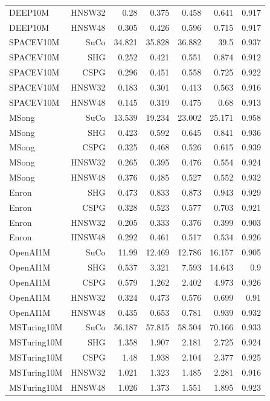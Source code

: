 \begin{table}[t]
\begin{tabular}{lrrrrrr}
DEEP10M & HNSW32 & 0.28 & 0.375 & 0.458 & 0.641 & 0.917 \\
DEEP10M & HNSW48 & 0.305 & 0.426 & 0.596 & 0.715 & 0.917 \\
SPACEV10M & SuCo & 34.821 & 35.828 & 36.882 & 39.5 & 0.937 \\
SPACEV10M & SHG & 0.252 & 0.421 & 0.551 & 0.874 & 0.912 \\
SPACEV10M & CSPG & 0.296 & 0.451 & 0.558 & 0.725 & 0.922 \\
SPACEV10M & HNSW32 & 0.183 & 0.301 & 0.413 & 0.563 & 0.916 \\
SPACEV10M & HNSW48 & 0.145 & 0.319 & 0.475 & 0.68 & 0.913 \\
MSong & SuCo & 13.539 & 19.234 & 23.002 & 25.171 & 0.958 \\
MSong & SHG & 0.423 & 0.592 & 0.645 & 0.841 & 0.936 \\
MSong & CSPG & 0.325 & 0.468 & 0.526 & 0.615 & 0.939 \\
MSong & HNSW32 & 0.265 & 0.395 & 0.476 & 0.554 & 0.924 \\
MSong & HNSW48 & 0.376 & 0.485 & 0.527 & 0.552 & 0.932 \\
Enron & SHG & 0.473 & 0.833 & 0.873 & 0.943 & 0.929 \\
Enron & CSPG & 0.328 & 0.523 & 0.577 & 0.703 & 0.921 \\
Enron & HNSW32 & 0.205 & 0.333 & 0.376 & 0.399 & 0.903 \\
Enron & HNSW48 & 0.292 & 0.461 & 0.517 & 0.534 & 0.926 \\
OpenAI1M & SuCo & 11.99 & 12.469 & 12.786 & 16.157 & 0.905 \\
OpenAI1M & SHG & 0.537 & 3.321 & 7.593 & 14.643 & 0.9 \\
OpenAI1M & CSPG & 0.579 & 1.262 & 2.402 & 4.973 & 0.926 \\
OpenAI1M & HNSW32 & 0.324 & 0.473 & 0.576 & 0.699 & 0.91 \\
OpenAI1M & HNSW48 & 0.435 & 0.653 & 0.781 & 0.939 & 0.932 \\
MSTuring10M & SuCo & 56.187 & 57.815 & 58.504 & 70.166 & 0.933 \\
MSTuring10M & SHG & 1.358 & 1.907 & 2.181 & 2.725 & 0.924 \\
MSTuring10M & CSPG & 1.48 & 1.938 & 2.104 & 2.377 & 0.925 \\
MSTuring10M & HNSW32 & 1.021 & 1.323 & 1.485 & 2.281 & 0.916 \\
MSTuring10M & HNSW48 & 1.026 & 1.373 & 1.551 & 1.895 & 0.923 \\
\bottomrule
\end{tabular}
\end{table}
